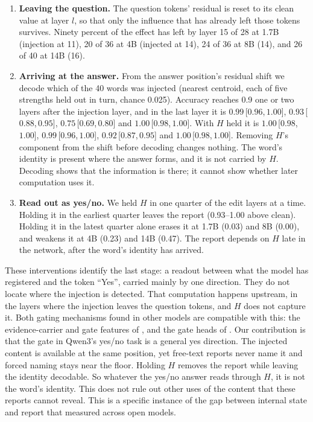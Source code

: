\documentclass[11pt]{article}
\newcommand{\ci}[3]{\ensuremath{#1}\,[\ensuremath{#2},\allowbreak\,\ensuremath{#3}]}
\begin{document}
\begin{enumerate}[leftmargin=*]
  \item \textbf{Leaving the question.} The question tokens' residual is reset to its clean value at layer $l$, so that only the influence that has already left those tokens survives. Ninety percent of the effect has left by layer 15 of 28 at 1.7B (injection at 11), 20 of 36 at 4B (injected at 14), 24 of 36 at 8B (14), and 26 of 40 at 14B (16).
  \item \textbf{Arriving at the answer.} From the answer position's residual shift we decode which of the 40 words was injected (nearest centroid, each of five strengths held out in turn, chance 0.025). Accuracy reaches 0.9 one or two layers after the injection layer, and in the last layer it is \ci{0.99}{0.96}{1.00}, \ci{0.93}{0.88}{0.95}, \ci{0.75}{0.69}{0.80} and \ci{1.00}{0.98}{1.00}. With $H$ held it is \ci{1.00}{0.98}{1.00}, \ci{0.99}{0.96}{1.00}, \ci{0.92}{0.87}{0.95} and \ci{1.00}{0.98}{1.00}. Removing $H$'s component from the shift before decoding changes nothing. The word's identity is present where the answer forms, and it is not carried by $H$. Decoding shows that the information is there; it cannot show whether later computation uses it.
  \item \textbf{Read out as yes/no.} We held $H$ in one quarter of the edit layers at a time. Holding it in the earliest quarter leaves the report (0.93--1.00 above clean). Holding it in the latest quarter alone erases it at 1.7B (0.03) and 8B (0.00), and weakens it at 4B (0.23) and 14B (0.47). The report depends on $H$ late in the network, after the word's identity has arrived.
\end{enumerate}

These interventions identify the last stage: a readout between what the model has registered and the token ``Yes'', carried mainly by one direction. They do not locate where the injection is detected. That computation happens upstream, in the layers where the injection leaves the question tokens, and $H$ does not capture it. Both gating mechanisms found in other models are compatible with this: the evidence-carrier and gate features of \citet{macar2026mechanisms}, and the gate heads of \citet{zou2026mechanistic}. Our contribution is that the gate in Qwen3's yes/no task is a general yes direction. The injected content is available at the same position, yet free-text reports never name it and forced naming stays near the floor. Holding $H$ removes the report while leaving the identity decodable. So whatever the yes/no answer reads through $H$, it is not the word's identity. This does not rule out other uses of the content that these reports cannot reveal. This is a specific instance of the gap between internal state and report that \citet{ferrara2026owmi} measured across open models.
\end{document}
